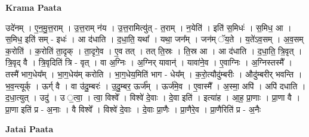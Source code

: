 \documentclass[17pt]{extarticle}
\begin{document}
\textbf{Krama Paata} \newline

उदे॑नम् । ए॒न॒मु॒त्त॒राम् । उ॒त्त॒राम् न॑य । उ॒त्त॒रामित्यु॑त् - त॒राम् । न॒येति॑ । इति॑ स॒मिधः॑ । स॒मिध॒ आ । स॒मिध॒ इति॑ सम् - इधः॑ । आ द॑धाति । द॒धा॒ति॒ यथा᳚ । यथा॒ जन᳚म् । जन॑म् ॅय॒ते । य॒ते॑ऽव॒सम् । अ॒व॒सम् क॒रोति॑ । क॒रोति॑ ता॒दृक् । ता॒दृगे॒व । ए॒व तत् । तत् ति॒स्रः । ति॒स्र आ । आ द॑धाति । द॒धा॒ति॒ त्रि॒वृत् । त्रि॒वृद् वै । त्रि॒वृदिति॑ त्रि - वृत् । वा अ॒ग्निः । अ॒ग्निर् यावान्॑ । यावा॑ने॒व । ए॒वाग्निः । अ॒ग्निस्तस्मै᳚ । तस्मै॑ भाग॒धेय᳚म् । भा॒ग॒धेय॑म् करोति । भा॒ग॒धेय॒मिति॑ भाग - धेय᳚म् । क॒रो॒त्यौदु॑म्बरीः । औदु॑म्बरीर् भवन्ति । भ॒व॒न्त्यूर्क् । ऊर्ग् वै । वा उ॑दु॒म्बरः॑ । उ॒दु॒म्बर॒ ऊर्ज᳚म् । ऊर्ज॑मे॒व । ए॒वास्मै᳚ । अ॒स्मा॒ अपि॑ । अपि॑ दधाति । द॒धा॒त्युत् । उदु॑ । उ ॒त्वा॒ । त्वा॒ विश्वे᳚ । विश्वे॑ दे॒वाः । दे॒वा इति॑ । इत्या॑ह । आ॒ह॒ प्रा॒णाः । प्रा॒णा वै । प्रा॒णा इति॑ प्र - अ॒नाः । वै विश्वे᳚ । विश्वे॑ दे॒वाः । दे॒वाः प्रा॒णैः । प्रा॒णैरे॒व । प्रा॒णैरिति॑ प्र - अ॒नैः \newline

\textbf{Jatai Paata} \newline
\end{document}
